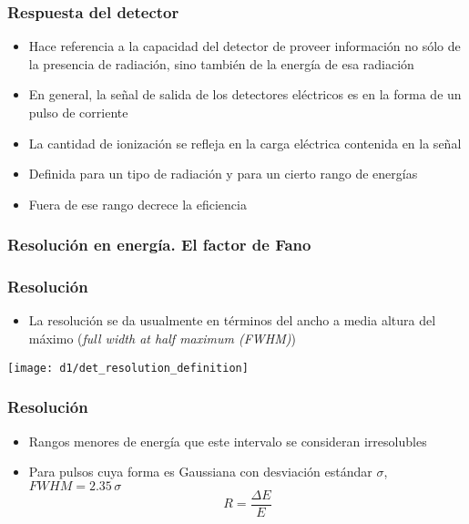 \documentclass{beamer}
\begin{document}
\begin{frame}
\frametitle{Respuesta del detector}
\begin{exampleblock}{}
\begin{itemize}
\item Hace referencia a la capacidad del detector de proveer informaci\'on no s\'olo
de la presencia de radiaci\'on, sino tambi\'en de la energ\'ia de esa radiaci\'on 
\item En general, la señal de salida de los detectores el\'ectricos es en la forma
de un pulso de corriente 
\item La cantidad de ionizaci\'on se refleja en la carga el\'ectrica contenida en la
señal
\end{itemize}
\end{exampleblock}
\begin{alertblock}{}
\begin{itemize}
\item Definida para un tipo de radiaci\'on y para un cierto rango de
energ\'ias 
\item Fuera de ese rango decrece la eficiencia
\end{itemize}
\end{alertblock}
\end{frame} 

\subsubsection{Resoluci\'on en energ\'ia. El factor de Fano}

\begin{frame}
\frametitle{Resoluci\'on}
\begin{alertblock}{}
\begin{itemize}
\item La resoluci\'on se da usualmente en t\'erminos del \alert{ancho a media altura del
m\'aximo (\textit{full width at half maximum (FWHM)}}) 
\end{itemize}
\end{alertblock}
\begin{center}
\texttt{[image: d1/det\_resolution\_definition]}
\end{center}
\end{frame} 

\begin{frame}
\frametitle{Resoluci\'on}
\begin{alertblock}{}
\begin{itemize}[<+->]
\item Rangos menores de energ\'ia que este intervalo se consideran irresolubles 
\item Para pulsos cuya forma es Gaussiana con desviaci\'on est\'andar $\sigma$, $FWHM = 2.35\,\sigma$
$$R = \frac{\Delta E}{E}$$
\end{itemize}
\end{alertblock}
\begin{center}
\end{center}
\end{frame} 
\end{document}
